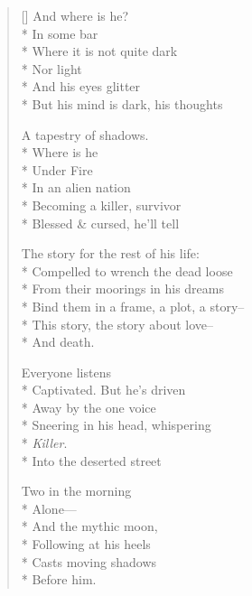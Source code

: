 \label{ch:under_fire}
\settowidth{\versewidth}{Bind them in a frame, a plot, a story--}
\begin{verse}[\versewidth]
And where is he?\\*
In some bar\\*
Where it is not quite dark\\*
Nor light\\*
And his eyes glitter\\*
But his mind is dark, his thoughts

A tapestry of shadows.\\*
Where is he\\*
Under Fire\\*
In an alien nation\\*
Becoming a killer, survivor\\*
Blessed \& cursed, he'll tell

The story for the rest of his life:\\*
Compelled to wrench the dead loose\\*
From their moorings in his dreams\\*
Bind them in a frame, a plot, a story--\\*
This story, the story about love--\\*
And death.

Everyone listens\\*
Captivated. But he's driven\\*
Away by the one voice\\*
Sneering in his head, whispering\\*
\textit{Killer}.\\*
 Into the deserted street

Two in the morning\\*
Alone---\\*
 And the mythic moon,\\*
Following at his heels\\*
Casts moving shadows\\*
Before him.
\end{verse}
